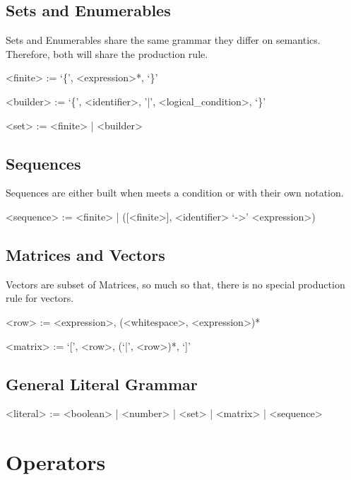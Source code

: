 \documentclass[11pt,a4paper]{book}
\begin{document}
\subsection{Sets and Enumerables}

Sets and Enumerables share the same grammar they differ on semantics. Therefore, both will share the  production rule.

\begin{grammar}
<finite> := `\{', <expression>*, `\}'

<builder> := `\{', <identifier>, '|', <logical\_condition>, `\}'

<set> := <finite> | <builder>
\end{grammar}

\subsection{Sequences}

Sequences are either built when  meets a condition or with their own notation.

\begin{grammar}
<sequence> := <finite> | ([<finite>], <identifier> `->' <expression>)
\end{grammar}

\subsection{Matrices and Vectors}

Vectors are subset of Matrices, so much so that, there is no special production rule for vectors.

\begin{grammar}
<row> := <expression>, (<whitespace>, <expression>)*

<matrix> := `[', <row>, (`|', <row>)*, `]'

\end{grammar}

\subsection{General Literal Grammar}

\begin{grammar}
<literal> := <boolean> | <number> | <set> | <matrix> | <sequence>
\end{grammar}

\section{Operators}
\end{document}
